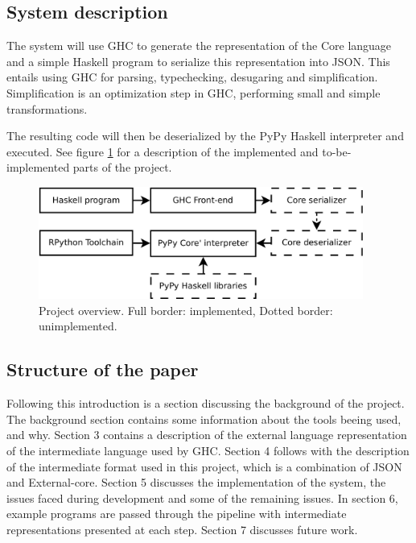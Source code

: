 \subsection{System description}

The system will use GHC to generate the 
representation of the Core language and a simple Haskell program to 
serialize this representation into JSON. This entails using GHC for
parsing, typechecking, desugaring and simplification. Simplification
is an optimization step in GHC, performing small and simple transformations.

The resulting code will then be deserialized by the PyPy Haskell interpreter 
and executed. See figure \ref{overview} for a description of the implemented and
to-be-implemented parts of the project.

\begin{figure}[H]
\centering
\includegraphics[width=0.95\textwidth]{diags/overview}
\caption[Project overview]{Project overview. Full border: implemented, Dotted border: unimplemented.}
\label{overview}
\end{figure}

\subsection{Structure of the paper}

Following this introduction is a section discussing the 
background of the project. The background section contains some information 
about the tools beeing used, and why.
Section 3 contains a description of the external language representation
of the intermediate language used by GHC.
Section 4 follows with the description of 
the intermediate format
used in this project, which is a combination of JSON and External-core.
Section 5 discusses the implementation of the system, the issues faced
during development and some of the remaining issues.
In section 6, example programs are passed through the pipeline 
with intermediate representations presented at each step.
Section 7 discusses future work.


